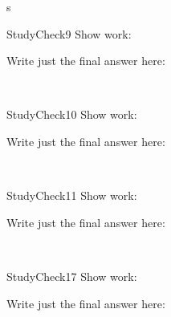 \documentclass[a4paper,8pt]{book}
\begin{document}
\begin{exam}{s}
\begin{verA}
   \begin{problem*}{StudyCheck9}\vspace{1cm}  
Show work: \begin{solution}[1.0in]\end{solution}
 \vspace{5cm}
Write just the final answer here:\begin{solution} \fillin{1in}{     }\end{solution}\\
\end{problem*}

   \begin{problem*}{StudyCheck10}\vspace{1cm}  
Show work: \begin{solution}[1.0in]\end{solution}
 \vspace{5cm}
Write just the final answer here:\begin{solution} \fillin{1in}{     }\end{solution}\\
\end{problem*}

   \begin{problem*}{StudyCheck11}\vspace{1cm}  
Show work: \begin{solution}[1.0in]\end{solution}
 \vspace{5cm}
Write just the final answer here:\begin{solution} \fillin{1in}{     }\end{solution}\\
\end{problem*}
 
\renewcommand\chapterlabel{Ch-acidbase}
   \begin{problem*}{StudyCheck17}\vspace{1cm}  
Show work: \begin{solution}[1.0in]\end{solution}
 \vspace{5cm}
Write just the final answer here:\begin{solution} \fillin{1in}{     }\end{solution}\\
\end{problem*}


\end{verA}
\end{exam}
\end{document}
